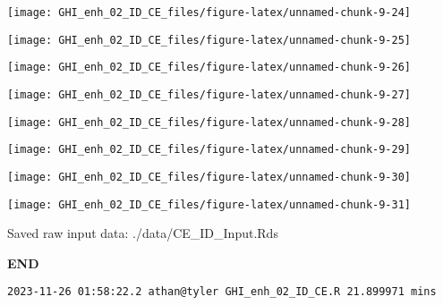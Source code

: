 \documentclass[
  10pt,
  a4paper,oneside]{article}
\begin{document}
\begin{center}\texttt{[image: GHI\_enh\_02\_ID\_CE\_files/figure-latex/unnamed-chunk-9-24]} \end{center}

\begin{center}\texttt{[image: GHI\_enh\_02\_ID\_CE\_files/figure-latex/unnamed-chunk-9-25]} \end{center}

\begin{center}\texttt{[image: GHI\_enh\_02\_ID\_CE\_files/figure-latex/unnamed-chunk-9-26]} \end{center}

\begin{center}\texttt{[image: GHI\_enh\_02\_ID\_CE\_files/figure-latex/unnamed-chunk-9-27]} \end{center}

\begin{center}\texttt{[image: GHI\_enh\_02\_ID\_CE\_files/figure-latex/unnamed-chunk-9-28]} \end{center}

\begin{center}\texttt{[image: GHI\_enh\_02\_ID\_CE\_files/figure-latex/unnamed-chunk-9-29]} \end{center}

\begin{center}\texttt{[image: GHI\_enh\_02\_ID\_CE\_files/figure-latex/unnamed-chunk-9-30]} \end{center}

\begin{center}\texttt{[image: GHI\_enh\_02\_ID\_CE\_files/figure-latex/unnamed-chunk-9-31]} \end{center}

Saved raw input data: ./data/CE\_ID\_Input.Rds

\textbf{END}

\begin{verbatim}
2023-11-26 01:58:22.2 athan@tyler GHI_enh_02_ID_CE.R 21.899971 mins
\end{verbatim}
\end{document}
